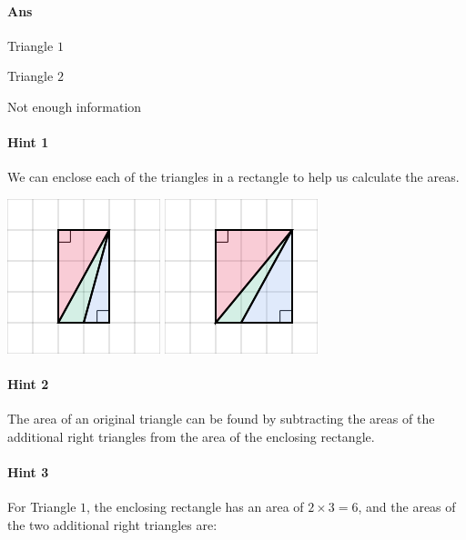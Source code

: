 \documentclass[twocolumn,10pt]{article}
\def\shrinkfactor{0.55}
\begin{document}
\paragraph{Ans} 

Triangle $1$

Triangle $2$


 Not enough information



\paragraph{Hint 1}We can enclose each of the triangles in a rectangle to help us calculate the areas.  

\includegraphics[scale=\shrinkfactor]{figures/4c4a94b2aca01211cb04207e5a823cc5d58570e3.png} 
\includegraphics[scale=\shrinkfactor]{figures/7d48421a544149b3e928997e62b20245c13ac51e.png}

\paragraph{Hint 2}The area of an original triangle can be found by subtracting the areas of the additional right triangles from the area of the enclosing rectangle.  

\paragraph{Hint 3}For Triangle $1$, the enclosing rectangle has an area of $2 \times 3 = 6$, and the areas of the two additional right triangles are:  
\end{document}
